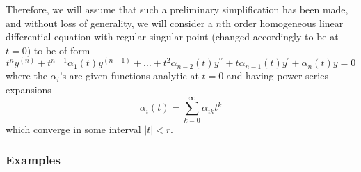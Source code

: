 \documentclass{article}
\theoremstyle{remark}
\theoremstyle{definition}
\begin{document}
Therefore, we will assume that such a preliminary simplification has been made, and without loss of generality, we will consider a $n$th order homogeneous linear differential equation with regular singular point (changed accordingly to be at $t = 0$) to be of form
\[t^n y^{(n)} + t^{n-1} \alpha_1 (t) y^{(n-1)} + \ldots + t^2 \alpha_{n-2} (t) y^{\prime\prime} + t \alpha_{n-1} (t) y^\prime + \alpha_n (t) y = 0\]
where the $\alpha_i$'s are given functions analytic at $t = 0$ and having power series expansions 
\[\alpha_i (t) = \sum_{k=0}^\infty \alpha_{ik} t^k\]
which converge in some interval $|t|<r$. 

\subsubsection{Examples}
\end{document}
